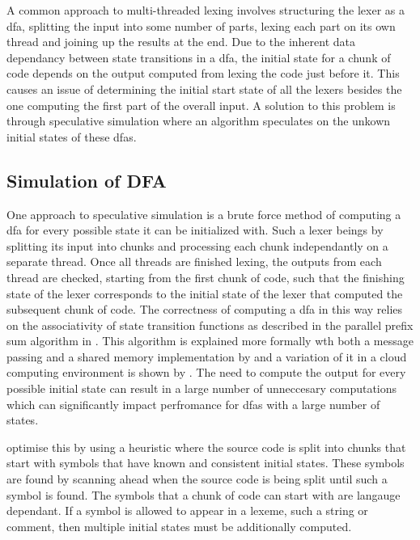 A common approach to multi-threaded lexing involves structuring the lexer as a
\gls{dfa}, splitting the input into some number of parts, lexing each part on
its own thread and joining up the results at the end. Due to the inherent data
dependancy between state transitions in a \gls{dfa}, the initial state for a
chunk of code depends on the output computed from lexing the code just before
it. This causes an issue of determining the initial start state of all the
lexers besides the one computing the first part of the overall input. A solution
to this problem is through speculative simulation where an algorithm speculates
on the unkown initial states of these \gls{dfa}s.

\subsection{Simulation of DFA} \label{simulation_of_dfa}

One approach to speculative simulation is a brute force method of computing
a \gls{dfa} for every possible state it can be initialized with. Such a
lexer beings by splitting its input into chunks and processing each chunk
independantly on a separate thread. Once all threads are finished lexing,
the outputs from each thread are checked, starting from the first chunk of
code, such that the finishing state of the lexer corresponds to the initial
state of the lexer that computed the subsequent chunk of code. The correctness
of computing a \gls{dfa} in this way relies on the  associativity of state
transition functions as described in the parallel prefix sum algorithm in
\cite{hillis_data_1986}. This algorithm is explained more formally wth both a
message passing and a shared memory implementation by \cite{holub_parallel_2009}
and a variation of it in a cloud computing environment is shown by
\cite{ko_speculative_2012}. The need to compute the output for every possible
initial state can result in a large number of unneccesary computations which can
significantly impact perfromance for \glspl{dfa} with a large number of states.

\cite{barenghi_parallel_2015} optimise this by using a heuristic where the
source code is split into chunks that start with symbols that have known and
consistent initial states. These symbols are found by scanning ahead when the
source code is being split until such a symbol is found. The symbols that a
chunk of code can start with are langauge dependant. If a symbol is allowed to
appear in a lexeme, such a string or comment, then multiple initial states must
be additionally computed.

